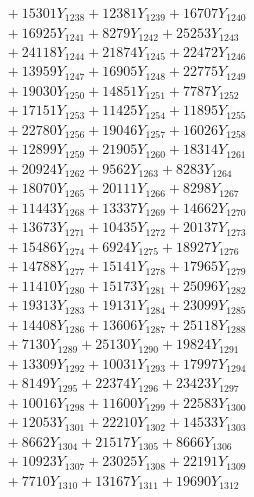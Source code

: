 \documentclass[a4paper,10pt]{article}
\begin{document}
{\begin{align}
&\;  + 15301 Y_{1238} + 12381 Y_{1239} + 16707 Y_{1240} \\[0.3ex]
&\;  + 16925 Y_{1241} + 8279 Y_{1242} + 25253 Y_{1243} \\[0.3ex]
&\;  + 24118 Y_{1244} + 21874 Y_{1245} + 22472 Y_{1246} \\[0.3ex]
&\;  + 13959 Y_{1247} + 16905 Y_{1248} + 22775 Y_{1249} \\[0.3ex]
&\;  + 19030 Y_{1250} + 14851 Y_{1251} + 7787 Y_{1252} \\[0.3ex]
&\;  + 17151 Y_{1253} + 11425 Y_{1254} + 11895 Y_{1255} \\[0.3ex]
&\;  + 22780 Y_{1256} + 19046 Y_{1257} + 16026 Y_{1258} \\[0.5ex]\allowbreak
&\;  + 12899 Y_{1259} + 21905 Y_{1260} + 18314 Y_{1261} \\[0.3ex]
&\;  + 20924 Y_{1262} + 9562 Y_{1263} + 8283 Y_{1264} \\[0.3ex]
&\;  + 18070 Y_{1265} + 20111 Y_{1266} + 8298 Y_{1267} \\[0.3ex]
&\;  + 11443 Y_{1268} + 13337 Y_{1269} + 14662 Y_{1270} \\[0.3ex]
&\;  + 13673 Y_{1271} + 10435 Y_{1272} + 20137 Y_{1273} \\[0.3ex]
&\;  + 15486 Y_{1274} + 6924 Y_{1275} + 18927 Y_{1276} \\[0.3ex]
&\;  + 14788 Y_{1277} + 15141 Y_{1278} + 17965 Y_{1279} \\[0.3ex]
&\;  + 11410 Y_{1280} + 15173 Y_{1281} + 25096 Y_{1282} \\[0.3ex]
&\;  + 19313 Y_{1283} + 19131 Y_{1284} + 23099 Y_{1285} \\[0.3ex]
&\;  + 14408 Y_{1286} + 13606 Y_{1287} + 25118 Y_{1288} \\[0.5ex]\allowbreak
&\;  + 7130 Y_{1289} + 25130 Y_{1290} + 19824 Y_{1291} \\[0.3ex]
&\;  + 13309 Y_{1292} + 10031 Y_{1293} + 17997 Y_{1294} \\[0.3ex]
&\;  + 8149 Y_{1295} + 22374 Y_{1296} + 23423 Y_{1297} \\[0.3ex]
&\;  + 10016 Y_{1298} + 11600 Y_{1299} + 22583 Y_{1300} \\[0.3ex]
&\;  + 12053 Y_{1301} + 22210 Y_{1302} + 14533 Y_{1303} \\[0.3ex]
&\;  + 8662 Y_{1304} + 21517 Y_{1305} + 8666 Y_{1306} \\[0.3ex]
&\;  + 10923 Y_{1307} + 23025 Y_{1308} + 22191 Y_{1309} \\[0.3ex]
&\;  + 7710 Y_{1310} + 13167 Y_{1311} + 19690 Y_{1312} \\[0.3ex]

\end{align}}
\end{document}
